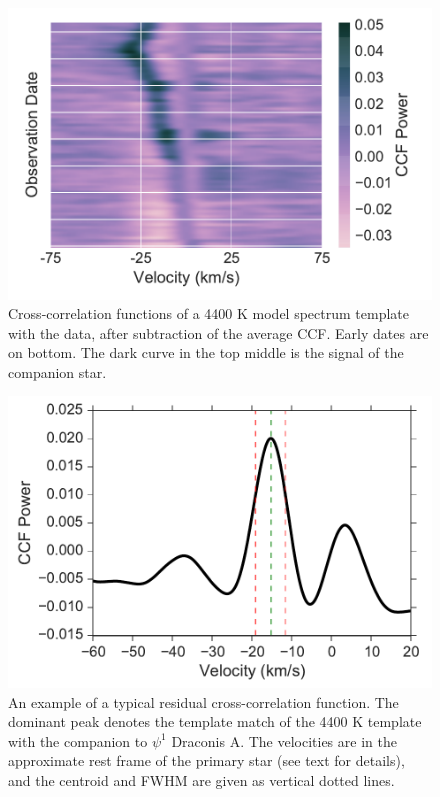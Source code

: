 \documentclass[twocolumn]{emulateapj}
\begin{document}
\begin{figure}
  \centering
  \includegraphics[width=\columnwidth]{Resid_CCFs.pdf}
  \caption{Cross-correlation functions of a 4400 K model spectrum template with the data, after subtraction of the average CCF. Early dates are on bottom. The dark curve in the top middle is the signal of the companion star.}
  \label{fig:resids}
\end{figure}



\begin{figure}
  \centering
  \includegraphics[width=\columnwidth]{Typical_CCF.pdf}
  \caption{An example of a typical residual cross-correlation function. The dominant peak denotes the template match of the 4400 K template with the companion to $\psi^1$ Draconis A. The velocities are in the approximate rest frame of the primary star (see text for details), and the centroid and FWHM are given as vertical dotted lines.}
  \label{fig:ccf_typical}
\end{figure}
\end{document}
